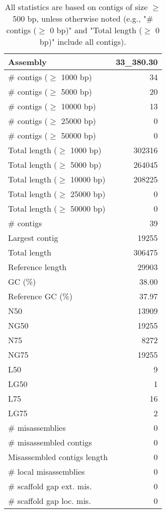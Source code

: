 \documentclass[12pt,a4paper]{article}
\begin{document}
\begin{table}[ht]
\begin{center}
\caption{All statistics are based on contigs of size $\geq$ 500 bp, unless otherwise noted (e.g., "\# contigs ($\geq$ 0 bp)" and "Total length ($\geq$ 0 bp)" include all contigs).}
\begin{tabular}{|l*{1}{|r}|}
\hline
Assembly & 33\_380.30 \\ \hline
\# contigs ($\geq$ 1000 bp) & 34 \\ \hline
\# contigs ($\geq$ 5000 bp) & 20 \\ \hline
\# contigs ($\geq$ 10000 bp) & 13 \\ \hline
\# contigs ($\geq$ 25000 bp) & 0 \\ \hline
\# contigs ($\geq$ 50000 bp) & 0 \\ \hline
Total length ($\geq$ 1000 bp) & 302316 \\ \hline
Total length ($\geq$ 5000 bp) & 264045 \\ \hline
Total length ($\geq$ 10000 bp) & 208225 \\ \hline
Total length ($\geq$ 25000 bp) & 0 \\ \hline
Total length ($\geq$ 50000 bp) & 0 \\ \hline
\# contigs & 39 \\ \hline
Largest contig & 19255 \\ \hline
Total length & 306475 \\ \hline
Reference length & 29903 \\ \hline
GC (\%) & 38.00 \\ \hline
Reference GC (\%) & 37.97 \\ \hline
N50 & 13909 \\ \hline
NG50 & 19255 \\ \hline
N75 & 8272 \\ \hline
NG75 & 19255 \\ \hline
L50 & 9 \\ \hline
LG50 & 1 \\ \hline
L75 & 16 \\ \hline
LG75 & 2 \\ \hline
\# misassemblies & 0 \\ \hline
\# misassembled contigs & 0 \\ \hline
Misassembled contigs length & 0 \\ \hline
\# local misassemblies & 0 \\ \hline
\# scaffold gap ext. mis. & 0 \\ \hline
\# scaffold gap loc. mis. & 0 \\ \hline

\end{tabular}
\end{center}
\end{table}
\end{document}
